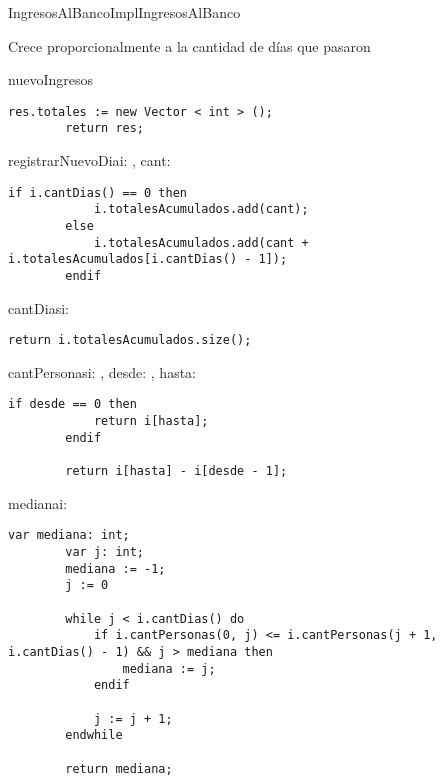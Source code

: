 \begin{module}{IngresosAlBancoImpl}{}{IngresosAlBanco}{}
	 \par
	Crece proporcionalmente a la cantidad de días que pasaron

	\begin{proc}{nuevoIngresos}{}{\moduletype}
		\begin{lstlisting}[numbers=none,frame=none]
		res.totales := new Vector < int > ();
		return res;
		\end{lstlisting}
	\end{proc}

	\begin{proc}{registrarNuevoDia}{\Inout i: \moduletype, \In cant: \Int}{}
		\begin{lstlisting}[numbers=none,frame=none]
		if i.cantDias() == 0 then
			i.totalesAcumulados.add(cant);
		else
			i.totalesAcumulados.add(cant + i.totalesAcumulados[i.cantDias() - 1]);
		endif
		\end{lstlisting}
	\end{proc}

	\begin{proc}{cantDias}{\In i: \moduletype}{\Int}
		\begin{lstlisting}[numbers=none,frame=none]
		return i.totalesAcumulados.size();
		\end{lstlisting}
	\end{proc}

	\begin{proc}{cantPersonas}{\In i: \moduletype, \In desde: \Int, \In hasta: \Int}{\Int}
		\begin{lstlisting}[numbers=none,frame=none]
		if desde == 0 then
			return i[hasta];
		endif

		return i[hasta] - i[desde - 1];
		\end{lstlisting}
	\end{proc}

	\begin{proc}{mediana}{\In i: \moduletype}{\Int}
		\begin{lstlisting}[numbers=none,frame=none]
		var mediana: int;
		var j: int;
		mediana := -1;
		j := 0

		while j < i.cantDias() do
			if i.cantPersonas(0, j) <= i.cantPersonas(j + 1, i.cantDias() - 1) && j > mediana then
				mediana := j;
			endif

			j := j + 1;
		endwhile

		return mediana;
		\end{lstlisting}
	\end{proc}
\end{module}

